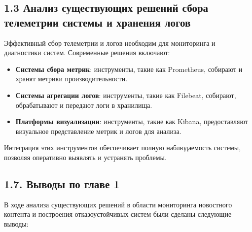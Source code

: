 \hypertarget{ux430ux43dux430ux43bux438ux437-ux441ux443ux449ux435ux441ux442ux432ux443ux44eux449ux438ux445-ux440ux435ux448ux435ux43dux438ux439-ux441ux431ux43eux440ux430-ux442ux435ux43bux435ux43cux435ux442ux440ux438ux438-ux441ux438ux441ux442ux435ux43cux44b-ux438-ux445ux440ux430ux43dux435ux43dux438ux44f-ux43bux43eux433ux43eux432}{%
\subsection{\texorpdfstring{\textbf{1.3 Анализ существующих решений
сбора телеметрии системы и хранения
логов}}{1.3 Анализ существующих решений сбора телеметрии системы и хранения логов}}\label{ux430ux43dux430ux43bux438ux437-ux441ux443ux449ux435ux441ux442ux432ux443ux44eux449ux438ux445-ux440ux435ux448ux435ux43dux438ux439-ux441ux431ux43eux440ux430-ux442ux435ux43bux435ux43cux435ux442ux440ux438ux438-ux441ux438ux441ux442ux435ux43cux44b-ux438-ux445ux440ux430ux43dux435ux43dux438ux44f-ux43bux43eux433ux43eux432}}

Эффективный сбор телеметрии и логов необходим для мониторинга и
диагностики систем. Современные решения включают:

\begin{itemize}
\tightlist
\item
  \textbf{Системы сбора метрик}: инструменты, такие как Prometheus,
  собирают и хранят метрики производительности.\\
\item
  \textbf{Системы агрегации логов}: инструменты, такие как Filebeat,
  собирают, обрабатывают и передают логи в хранилища.\\
\item
  \textbf{Платформы визуализации}: инструменты, такие как Kibana,
  предоставляют визуальное представление метрик и логов для анализа.
\end{itemize}

Интеграция этих инструментов обеспечивает полную наблюдаемость системы,
позволяя оперативно выявлять и устранять проблемы.

\hypertarget{ux432ux44bux432ux43eux434ux44b-ux43fux43e-ux433ux43bux430ux432ux435-1}{%
\subsection{1.7. Выводы по главе
1}\label{ux432ux44bux432ux43eux434ux44b-ux43fux43e-ux433ux43bux430ux432ux435-1}}

В ходе анализа существующих решений в области мониторинга новостного
контента и построения отказоустойчивых систем были сделаны следующие
выводы:

